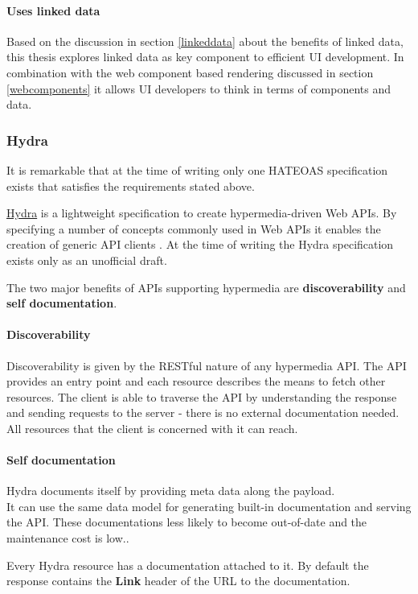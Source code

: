 \paragraph{Uses linked data}
Based on the discussion in section \ref{linkeddata} about the benefits of linked data, this thesis explores linked data as key component to efficient UI development. In combination with the web component based rendering discussed in section \ref{webcomponents} it allows UI developers to think in terms of components and data.

\subsubsection{Hydra}
It is remarkable that at the time of writing only one HATEOAS specification exists that satisfies the requirements stated above.

\href{http://www.hydra-cg.com/}{Hydra} is a lightweight specification to create hypermedia-driven Web APIs. By specifying a number of concepts commonly used in Web APIs it enables the creation of generic API clients \citep{hydraspecs}. At the time of writing the Hydra specification exists only as an unofficial draft.

The two major benefits of APIs supporting hypermedia are \textbf{discoverability} and \textbf{self documentation}. \\
\paragraph{Discoverability} Discoverability is given by the RESTful nature of any hypermedia API. The API provides an entry point and each resource describes the means to fetch other resources. The client is able to traverse the API by understanding the response and sending requests to the server - there is no external documentation needed. All resources that the client is concerned with it can reach.

\paragraph{Self documentation}
Hydra documents itself by providing meta data along the payload. \\
It can use the same data model for generating built-in documentation and serving the API. These documentations less likely to become out-of-date and the maintenance cost is low..

Every Hydra resource has a documentation attached to it. By default the response contains the \textbf{Link} header of the URL to the documentation.

